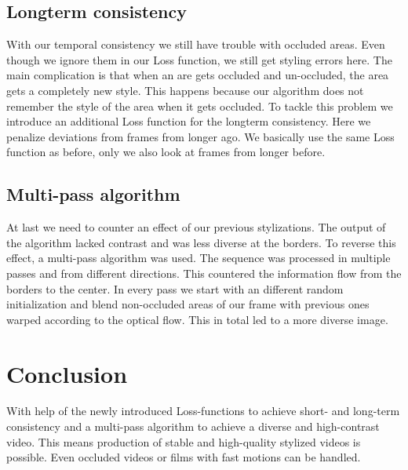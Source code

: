 \documentclass[acmtog, authorversion]{acmart}
\begin{document}
\subsection{Longterm consistency}
With our temporal consistency we still have trouble with occluded areas. Even though we ignore them in our Loss function, we still get styling errors here. The main complication is that when an are gets occluded and un-occluded, the area gets a completely new style. This happens because our algorithm does not remember the style of the area when it gets occluded. To tackle this problem we introduce an additional Loss function for the longterm consistency. Here we penalize deviations from frames from longer ago. We basically use the same Loss function as before, only we also look at frames from longer before. 
\subsection{Multi-pass algorithm}
At last we need to counter an effect of our previous stylizations. The output of the algorithm lacked contrast and was less diverse at the borders. To reverse this effect, a multi-pass algorithm was used. The sequence was processed in multiple passes and from different directions. This countered the information flow from the borders to the center. In every pass we start with an different random initialization and blend non-occluded areas of our frame with previous ones warped according to the optical flow. This in total led to a more diverse image. 
\section{Conclusion}
With help of the newly introduced Loss-functions to achieve short- and long-term consistency and a multi-pass algorithm to achieve a diverse and high-contrast video. This means production of stable and high-quality stylized videos is possible. Even occluded videos or films with fast motions can be handled. 







\end{document}
